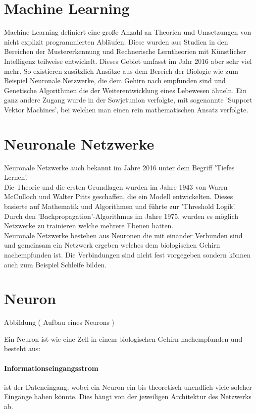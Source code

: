 \section{Machine Learning}

Machine Learning definiert eine große Anzahl an Theorien und Umsetzungen von nicht explizit programmierten Abläufen. Diese wurden aus Studien in den Bereichen der Mustererkennung und Rechnerische Lerntheorien mit Künstlicher Intelligenz teilweise entwickelt. Dieses Gebiet umfasst im Jahr 2016 aber sehr viel mehr. So existieren zusätzlich Ansätze aus dem Bereich der Biologie wie zum Beispiel Neuronale Netzwerke, die dem Gehirn nach empfunden sind und Genetische Algorithmen die der Weiterentwicklung eines Lebewesen ähneln. Ein ganz andere Zugang wurde in der Sowjetunion verfolgte, mit sogenannte 'Support Vektor Machines', bei welchen man einen rein mathematischen Ansatz verfolgte.

\section{Neuronale Netzwerke}

Neuronale Netzwerke auch bekannt im Jahre 2016 unter dem Begriff 'Tiefes Lernen'. \\

Die Theorie und die ersten Grundlagen wurden im Jahre 1943 von Warrn McCulloch und Walter Pitts geschaffen, die ein Modell entwickelten. Dieses basierte auf Mathematik und Algorithmen und führte zur 'Threshold Logik'. Durch den 'Backpropagation'-Algorithmus im Jahre 1975, wurden es möglich Netzwerke zu trainieren welche mehrere Ebenen hatten. \\

Neuronale Netzwerke bestehen aus Neuronen die mit einander Verbunden sind und gemeinsam ein Netzwerk ergeben welches dem biologischen Gehirn nachempfunden ist. Die Verbindungen sind nicht fest vorgegeben sondern können auch zum Beispiel Schleife bilden.


\section{Neuron}

Abbildung ( Aufbau eines Neurons )

Ein Neuron ist wie eine Zell in einem biologischen Gehirn nachempfunden und besteht aus:
\paragraph{Informationseingangsstrom} ist der Dateneingang, wobei ein Neuron ein bis theoretisch unendlich viele solcher Eingänge haben könnte. Dies hängt von der jeweiligen Architektur des Netzwerks ab.

